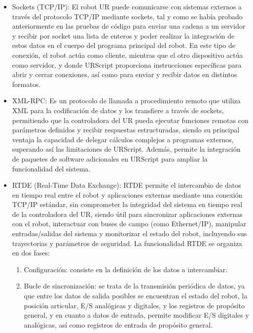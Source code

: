 \begin{itemize}
    \item Sockets (TCP/IP): El robot UR puede comunicarse con sistemas externos a través del protocolo TCP/IP mediante sockets, tal y como se había probado anteriormente en las pruebas de código para enviar una cadena a un servidor y recibir por socket una lista de enteros y poder realizar la integración de estos datos en el cuerpo del programa principal del robot. En este tipo de conexión, el robot actúa como cliente, mientras que el otro dispositivo actúa como servidor, y donde URScript proporciona instrucciones específicas para abrir y cerrar conexiones, así como para enviar y recibir datos en distintos formatos. 
    
    \item XML-RPC: Es un protocolo de llamada a procedimiento remoto que utiliza XML para la codificación de datos y los transfiere a través de sockets, permitiendo que la controladora del UR pueda ejecutar funciones remotas con parámetros definidos y recibir respuestas estructuradas, siendo su principal ventaja la capacidad de delegar cálculos complejos a programas externos, superando así las limitaciones de URScript. Además, permite la integración de paquetes de software adicionales en URScript para ampliar la funcionalidad del sistema.
    
    \item RTDE (Real-Time Data Exchange): RTDE permite el intercambio de datos en tiempo real entre el robot y aplicaciones externas mediante una conexión TCP/IP estándar, sin comprometer la integridad del sistema en tiempo real de la controladora del UR, siendo útil para sincronizar aplicaciones externas con el robot, interactuar con buses de campo (como Ethernet/IP), manipular entradas/salidas del sistema y monitorizar el estado del robot, incluyendo sus trayectorias y parámetros de seguridad. La funcionalidad RTDE se organiza en dos fases:
      \begin{enumerate}
        \item Configuración: consiste en la definición de los datos a intercambiar.
        \item Bucle de sincronización: se trata de la transmisión periódica de datos, ya que entre los datos de salida posibles se encuentran el estado del robot, la posición articular, E/S analógicas y digitales, y los registros de propósito general, y en cuanto a datos de entrada, permite modificar E/S digitales y analógicas, así como registros de entrada de propósito general.
      \end{enumerate}
      

\end{itemize}
